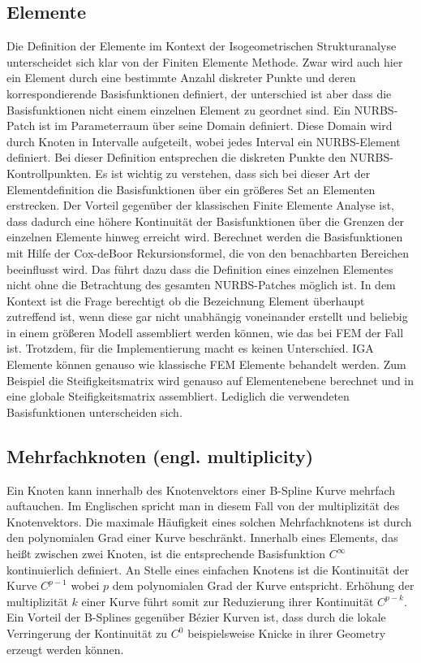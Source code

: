 \documentclass[german,a4paper,12pt,oneside]{scrbook}
\theoremstyle{definition}
\theoremstyle{definition}
\theoremstyle{definition}
\theoremstyle{definition}
\theoremstyle{definition}
\theoremstyle{definition}
\begin{document}
\subsection{Elemente}
Die Definition der Elemente im Kontext der Isogeometrischen Strukturanalyse unterscheidet sich klar von der Finiten Elemente Methode. Zwar wird auch hier ein Element durch eine bestimmte Anzahl diskreter Punkte und deren korrespondierende Basisfunktionen definiert, der unterschied ist aber dass die Basisfunktionen nicht einem einzelnen Element zu geordnet sind. Ein NURBS-Patch ist im Parameterraum über seine Domain definiert. Diese Domain wird durch Knoten in Intervalle aufgeteilt, wobei jedes Interval ein NURBS-Element definiert. Bei dieser Definition entsprechen die diskreten Punkte den NURBS-Kontrollpunkten. Es ist wichtig zu verstehen, dass sich bei dieser Art der Elementdefinition die Basisfunktionen über ein größeres Set an Elementen erstrecken. Der Vorteil gegenüber der klassischen Finite Elemente Analyse ist, dass dadurch eine höhere Kontinuität der Basisfunktionen über die Grenzen der einzelnen Elemente hinweg erreicht wird. 
Berechnet werden die Basisfunktionen mit Hilfe der Cox-deBoor Rekursionsformel, die von den benachbarten Bereichen beeinflusst wird. Das führt dazu dass die Definition eines einzelnen Elementes nicht ohne die Betrachtung des gesamten NURBS-Patches möglich ist. In dem Kontext ist die Frage berechtigt ob die Bezeichnung Element überhaupt zutreffend ist, wenn diese gar nicht unabhängig voneinander erstellt und beliebig in einem größeren Modell assembliert werden können, wie das bei FEM der Fall ist. Trotzdem, für die Implementierung macht es keinen Unterschied. IGA Elemente können genauso wie klassische FEM Elemente behandelt werden. Zum Beispiel die Steifigkeitsmatrix wird genauso auf Elementenebene berechnet und in eine globale Steifigkeitsmatrix assembliert. Lediglich die verwendeten Basisfunktionen unterscheiden sich. 

\subsection{Mehrfachknoten (engl. multiplicity)}
Ein Knoten kann innerhalb des Knotenvektors einer B-Spline Kurve mehrfach auftauchen. Im Englischen spricht man in diesem Fall von der multiplizität des Knotenvektors. Die maximale Häufigkeit eines solchen Mehrfachknotens ist durch den polynomialen Grad einer Kurve beschränkt. Innerhalb eines Elements, das heißt zwischen zwei Knoten, ist die entsprechende Basisfunktion $C^{\infty}$ kontinuierlich definiert. An Stelle eines einfachen Knotens ist die Kontinuität der Kurve $C^{p-1}$ wobei $p$ dem polynomialen Grad der Kurve entspricht. Erhöhung der multiplizität $k$ einer Kurve führt somit zur Reduzierung ihrer Kontinuität $C^{p-k}$. Ein Vorteil der B-Splines gegenüber Bézier Kurven ist, dass durch die lokale Verringerung der Kontinuität zu $C^{0}$ beispielsweise Knicke in ihrer Geometry erzeugt werden können.
\end{document}
